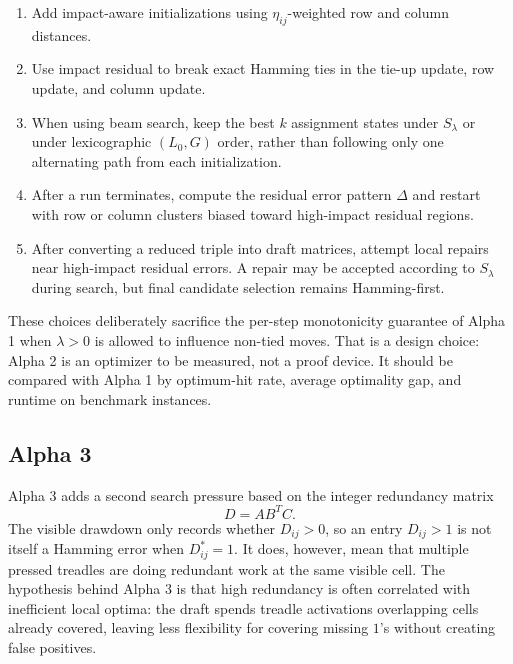 \documentclass[11pt]{article}
\begin{document}
\begin{enumerate}[label=\textbf{A2.\arabic*.}]
  \item Add impact-aware initializations using \(\eta_{ij}\)-weighted row and
  column distances.

  \item Use impact residual to break exact Hamming ties in the tie-up update, row
  update, and column update.

  \item When using beam search, keep the best \(k\) assignment states under
  \(S_\lambda\) or under lexicographic \((L_0,G)\) order, rather than following
  only one alternating path from each initialization.

  \item After a run terminates, compute the residual error pattern
  \(\Delta\) and restart with row or column clusters biased toward high-impact
  residual regions.

  \item After converting a reduced triple into draft matrices, attempt local
  repairs near high-impact residual errors. A repair may be accepted according
  to \(S_\lambda\) during search, but final candidate selection remains
  Hamming-first.
\end{enumerate}

These choices deliberately sacrifice the per-step monotonicity guarantee of
Alpha 1 when \(\lambda>0\) is allowed to influence non-tied moves. That is a
design choice: Alpha 2 is an optimizer to be measured, not a proof device. It
should be compared with Alpha 1 by optimum-hit rate, average optimality gap, and
runtime on benchmark instances.

\subsection{Alpha 3}

Alpha 3 adds a second search pressure based on the integer redundancy matrix
\[
  D=AB^TC.
\]
The visible drawdown only records whether \(D_{ij}>0\), so an entry
\(D_{ij}>1\) is not itself a Hamming error when \(D^\ast_{ij}=1\). It does,
however, mean that multiple pressed treadles are doing redundant work at the
same visible cell. The hypothesis behind Alpha 3 is that high redundancy is
often correlated with inefficient local optima: the draft spends treadle
activations overlapping cells already covered, leaving less flexibility for
covering missing \(1\)'s without creating false positives.
\end{document}
